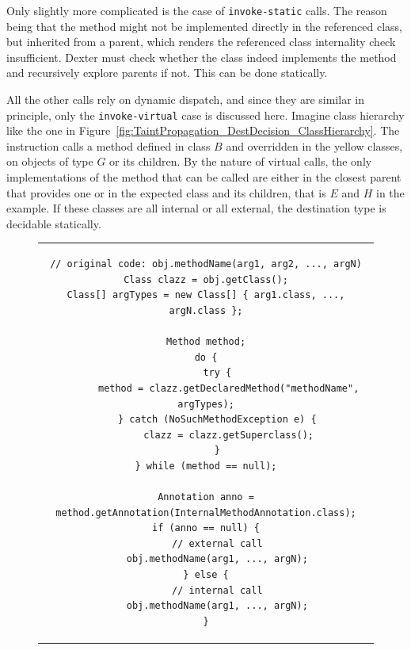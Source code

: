 \documentclass[12pt,twoside,notitlepage]{report}
\begin{document}
Only slightly more complicated is the case of \verb$invoke-static$ calls. The reason being that the method might not be implemented directly in the referenced class, but inherited from a parent, which renders the referenced class internality check insufficient. Dexter must check whether the class indeed implements the method and recursively explore parents if not. This can be done statically.

All the other calls rely on dynamic dispatch, and since they are similar in principle, only the \verb$invoke-virtual$ case is discussed here. Imagine class hierarchy like the one in Figure~\ref{fig:TaintPropagation_DestDecision_ClassHierarchy}. The instruction calls a method defined in class $B$ and overridden in the yellow classes, on objects of type $G$ or its children. By the nature of virtual calls, the only implementations of the method that can be called are either in the closest parent that provides one or in the expected class and its children, that is $E$ and $H$ in the example. If these classes are all internal or all external, the destination type is decidable statically. 

\begin{figure}
	\centering
	\begin{tabular}{c}
	\begin{lstlisting}
// original code: obj.methodName(arg1, arg2, ..., argN)
Class clazz = obj.getClass();
Class[] argTypes = new Class[] { arg1.class, ..., argN.class };

Method method;
do {
	try {
 		method = clazz.getDeclaredMethod("methodName", argTypes);
 	} catch (NoSuchMethodException e) {
 		clazz = clazz.getSuperclass();
 	}
} while (method == null);

Annotation anno = method.getAnnotation(InternalMethodAnnotation.class);
if (anno == null) {
	// external call
	obj.methodName(arg1, ..., argN);
} else {
	// internal call
	obj.methodName(arg1, ..., argN);
}
	\end{lstlisting}
	\end{tabular}
	\begin{lstlisting}[caption={Destination-deciding instrumentation for non-public methods},
	                   label={listing:TaintPropagation_MethodCall_DestDecidability_NonPublic}]
	\end{lstlisting}
\end{figure}
\end{document}
